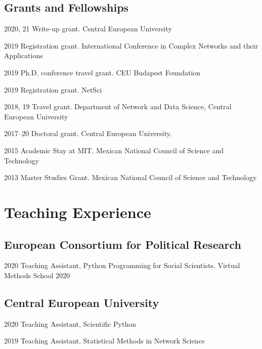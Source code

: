 \documentclass{academiccv}
\begin{document}
\subsection*{Grants and Fellowships}
\begin{tablist}
	\item[2020, 21] \tab Write-up grant. Central European University 
	\item[2019] \tab Registration grant. International Conference in Complex Networks and their Applications
	\item[2019] \tab Ph.D. conference travel grant. CEU Budapest Foundation
	\item[2019] \tab Registration grant. NetSci 
	\item[2018, 19] \tab Travel grant. Department of Network and Data Science, Central European University
	\item[2017--20] \tab Doctoral grant. Central European University. 
	\item[2015] \tab Academic Stay at MIT. Mexican National Council of Science and Technology
	\item[2013] \tab Master Studies Grant. Mexican National Council of Science and Technology
\end{tablist}

\section*{Teaching Experience}
\subsection*{European Consortium for Political Research}
\begin{tablist}
	\item[2020] \tab Teaching Assistant, Python Programming for Social Scientists. Virtual Methods School 2020
\end{tablist}

\subsection*{Central European University}
\begin{tablist}
	\item[2020] \tab Teaching Assistant, Scientific Python
	\item[2019] \tab Teaching Assistant, Statistical Methods in Network Science
\end{tablist}
\end{document}

